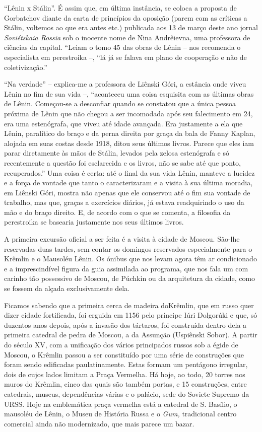 ``Lênin x Stálin''. É assim que, em última instância, se coloca a
proposta de Gorbatchov diante da carta de princípios da oposição (parem
com as críticas a Stálin, voltemos ao que era antes etc.) publicada aos
13 de março deste ano jornal \emph{Soviétskaia Rossia} sob o inocente
nome de Nina Andrêievna, uma professora de ciências da capital. ``Leiam
o tomo 45 das obras de Lênin -- nos recomenda o especialista em
perestroika --, ``lá já se falava em plano de cooperação e não de
coletivização.''

``Na verdade'' -- explica-me a professora de Liênski Góri, a estância
onde viveu Lênin no fim de sua vida --, ``aconteceu uma coisa esquisita
com as últimas obras de Lênin. Começou-se a desconfiar quando se
constatou que a única pessoa próxima de Lênin que não chegou a ser
incomodada após seu falecimento em 24, era uma estenógrafa, que viveu
até idade avançada. Era justamente a ela que Lênin, paralítico do braço
e da perna direita por graça da bala de Fanny Kaplan, alojada em suas
costas desde 1918, ditou seus últimos livros. Parece que eles iam parar
diretamente às mãos de Stálin, levados pela zelosa estenógrafa e só
recentemente a questão foi esclarecida e os livros, não se sabe até que
ponto, recuperados.'' Uma coisa é certa: até o final da sua vida Lênin,
manteve a lucidez e a força de vontade que tanto o caracterizaram e a
visita à sua última moradia, em Liênski Góri, mostra não apenas que ele
conservou até o fim sua vontade de trabalho, mas que, graças a
exercícios diários, já estava readquirindo o uso da mão e do braço
direito. E, de acordo com o que se comenta, a filosofia da perestroika
se basearia justamente nos seus últimos livros.

A primeira excursão oficial a ser feita é a visita à cidade de Moscou.
São-lhe reservadas duas tardes, sem contar os domingos reservados
especialmente para o Krêmlin e o Mausoléu Lênin. Os ónibus que nos levam
agora têm ar condicionado e a imprescindível figura da guia assimilada
ao programa, que nos fala um com carinho tão possessivo de Moscou, de
Púchkin ou da arquitetura da cidade, como se fossem da alçada
exclusivamente dela.

Ficamos sabendo que a primeira cerca de madeira doKrêmlin, que em russo
quer dizer cidade fortificada, foi erguida em 1156 pelo príncipe Iúri
Dolgorúki e que, só duzentos anos depois, após a invasão dos tártaros,
foi construída dentro dela a primeira catedral de pedra de Moscou, a da
Assunção (Uspiênski Sobor). A partir do século XV, com a unificação dos
vários principados russos sob a égide de Moscou, o Krêmlin passou a ser
constituído por uma série de construções que foram sendo edificadas
paulatinamente. Estas formam um pentágono irregular, dois de cujos lados
limitam a Praça Vermelha. Há hoje, ao todo, 20 torres nos muros do
Krêmlin, cinco das quais são também portas, e 15 construções, entre
catedrais, museus, dependências várias e o palácio, sede do Soviete
Supremo da URSS. Hoje na emblemática praça vermelha está a catedral de
S. Basílio, o mausoléu de Lênin, o Museu de História Russa e o
\emph{Gum,} tradicional centro comercial ainda não modernizado, que mais
parece um bazar.

